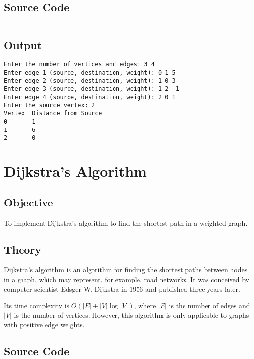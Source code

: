 \documentclass{korigamik}
\begin{document}
\subsection{Source Code}
\inputminted[firstline=6, lastline=55, fontsize=\footnotesize]{cpp}{code/bellmanford.cpp}

\subsection{Output}
\begin{lstlisting}[style=output]
Enter the number of vertices and edges: 3 4
Enter edge 1 (source, destination, weight): 0 1 5
Enter edge 2 (source, destination, weight): 1 0 3
Enter edge 3 (source, destination, weight): 1 2 -1
Enter edge 4 (source, destination, weight): 2 0 1
Enter the source vertex: 2
Vertex  Distance from Source
0       1
1       6
2       0
\end{lstlisting}

\pagebreak

\section{Dijkstra's Algorithm}
\label{sec:Dijkstra's Algorithm}

\subsection{Objective}
To implement Dijkstra's algorithm to find the shortest path
in a weighted graph.

\subsection{Theory}
Dijkstra's algorithm is an algorithm for finding the shortest paths between
nodes in a graph, which may represent, for example, road networks. It was
conceived by computer scientist Edsger W. Dijkstra in 1956 and published three
years later.

Its time complexity is $O(|E| + |V| \log |V|)$, where $|E|$ is the number of
edges and $|V|$ is the number of vertices. However, this algorithm is only
applicable to graphs with positive edge weights.

\subsection{Source Code}

\inputminted[firstline=10, fontsize=\footnotesize]{cpp}{code/dijkstra.cpp}
\end{document}
